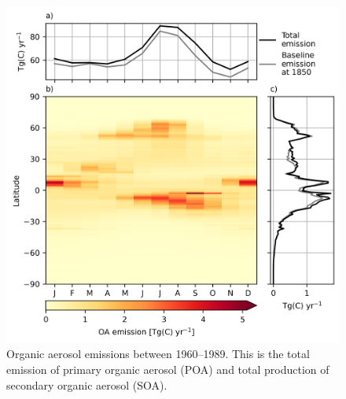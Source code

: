 \begin{figure}
    \centering
    \includegraphics{Appendix1/figs/emioa_monthly_pothole.png}
    \caption[Organic aerosol emissions between 1960--1989]{Organic aerosol emissions between 1960--1989. This is the total emission of primary organic aerosol (POA) and total production of secondary organic aerosol (SOA).}
    \label{fig:app1:seasonal-emioa-pothole}
\end{figure}

